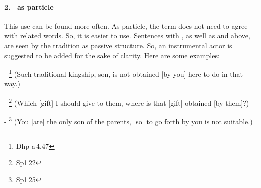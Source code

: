 \paragraph*{2.\  as particle} This use can be found more often. As particle, the term does not need to agree with related words. So, it is easier to use. Sentences with , as well as  and  above, are seen by the tradition as passive structure. So, an instrumental actor is suggested to be added for the sake of clarity. Here are some examples:\par
- \footnote{Dhp-a\,4.47} (Such traditional kingship, son, is not obtained [by you] here to do in that way.)\par
- \footnote{Sp1\,22} (Which [gift] I should give to them, where is that [gift] obtained [by them]?)\par
- \footnote{Sp1\,25} (You [are] the only son of the parents, [so] to go forth by you is not suitable.)\par
